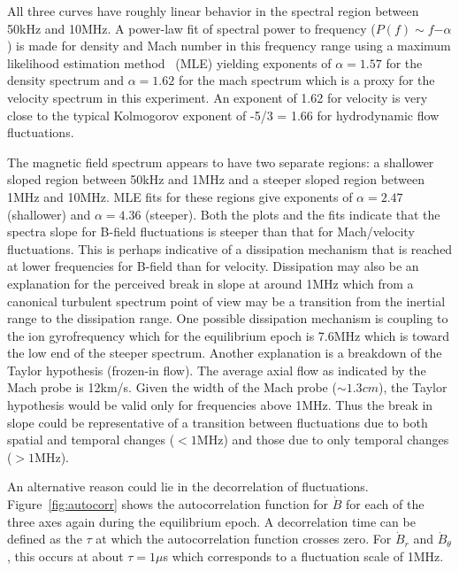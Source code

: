 \documentclass[12pt]{iopart}
\begin{document}
All three curves have roughly linear behavior in the spectral region between 50kHz and 10MHz. A power-law fit of spectral power to frequency ($P(f) \sim f{-\alpha}$) is made for density and Mach number in this frequency range using a maximum likelihood estimation method~\cite{clauset09} (MLE) yielding exponents of $\alpha = 1.57$ for the density spectrum and $\alpha = 1.62$ for the mach spectrum which is a proxy for the velocity spectrum in this experiment. An exponent of 1.62 for velocity is very close to the typical Kolmogorov exponent of -5/3 = 1.66 for hydrodynamic flow fluctuations.

The magnetic field spectrum appears to have two separate regions: a shallower sloped region between 50kHz and 1MHz and a steeper sloped region between 1MHz and 10MHz. MLE fits for these regions give exponents of $\alpha = 2.47$ (shallower) and $\alpha = 4.36$ (steeper). Both the plots and the fits indicate that the spectra slope for B-field fluctuations is steeper than that for Mach/velocity fluctuations. This is perhaps indicative of a dissipation mechanism that is reached at lower frequencies for B-field than for velocity. Dissipation may also be an explanation for the perceived break in slope at around 1MHz which from a canonical turbulent spectrum point of view may be a transition from the inertial range to the dissipation range. One possible dissipation mechanism is coupling to the ion gyrofrequency which for the equilibrium epoch is 7.6MHz which is toward the low end of the steeper spectrum. Another explanation is a breakdown of the Taylor hypothesis (frozen-in flow). The average axial flow as indicated by the Mach probe is 12km/s. Given the width of the Mach probe ($\sim 1.3cm$), the Taylor hypothesis would be valid only for frequencies above 1MHz. Thus the break in slope could be representative of a transition between fluctuations due to both spatial and temporal changes ($<1$MHz) and those due to only temporal changes ($>1$MHz).

An alternative reason could lie in the decorrelation of fluctuations. Figure~\ref{fig:autocorr} shows the autocorrelation function for $\dot{B}$ for each of the three axes again during the equilibrium epoch. A decorrelation time can be defined as the $\tau$ at which the autocorrelation function crosses zero. For $\dot{B}_{r}$ and $\dot{B}_{\theta}$, this occurs at about $\tau = 1\mu$s which corresponds to a fluctuation scale of 1MHz.

\end{document}

